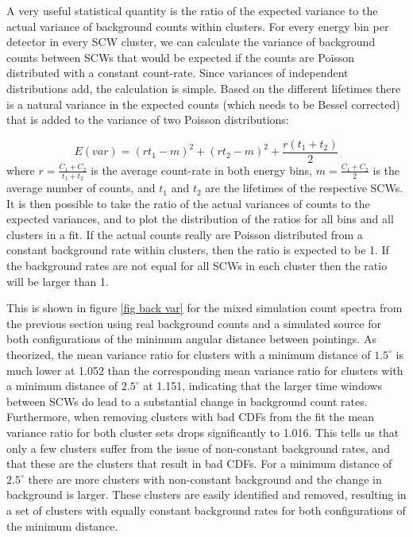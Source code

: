 \documentclass{report}
\begin{document}
A very useful statistical quantity is the ratio of the expected variance to the actual variance of background counts within clusters. For every energy bin per detector in every SCW cluster, we can calculate the variance of background counts between SCWs that would be expected if the counts are Poisson distributed with a constant count-rate. Since variances of independent distributions add, the calculation is simple. Based on the different lifetimes there is a natural variance in the expected counts (which needs to be Bessel corrected) that is added to the variance of two Poisson distributions:

\begin{equation}
  E(var) = (rt_1 - m)^2 + (rt_2 - m)^2 + \frac{r(t_1+t_2)}{2}
\end{equation}
where $r=\frac{C_1+C_2}{t_1+t_2}$ is the average count-rate in both energy bins, $m=\frac{C_1+C_2}{2}$ is the average number of counts, and $t_1$ and $t_2$ are the lifetimes of the respective SCWs. It is then possible to take the ratio of the actual variances of counts to the expected variances, and to plot the distribution of the ratios for all bins and all clusters in a fit. If the actual counts really are Poisson distributed from a constant background rate within clusters, then the ratio is expected to be 1. If the background rates are not equal for all SCWs in each cluster then the ratio will be larger than 1.

This is shown in figure \ref{fig back var} for the mixed simulation count spectra from the previous section using real background counts and a simulated source for both configurations of the minimum angular distance between pointings. As theorized, the mean variance ratio for clusters with a minimum distance of $1.5^\circ$ is much lower at 1.052 than the corresponding mean variance ratio for clusters with a minimum distance of $2.5^\circ$ at 1.151, indicating that the larger time windows between SCWs do lead to a substantial change in background count rates. Furthermore, when removing clusters with bad CDFs from the fit the mean variance ratio for both cluster sets drops significantly to 1.016. This tells us that only a few clusters suffer from the issue of non-constant background rates, and that these are the clusters that result in bad CDFs. For a minimum distance of $2.5^\circ$ there are more clusters with non-constant background and the change in background is larger. These clusters are easily identified and removed, resulting in a set of clusters with equally constant background rates for both configurations of the minimum distance.
\end{document}
